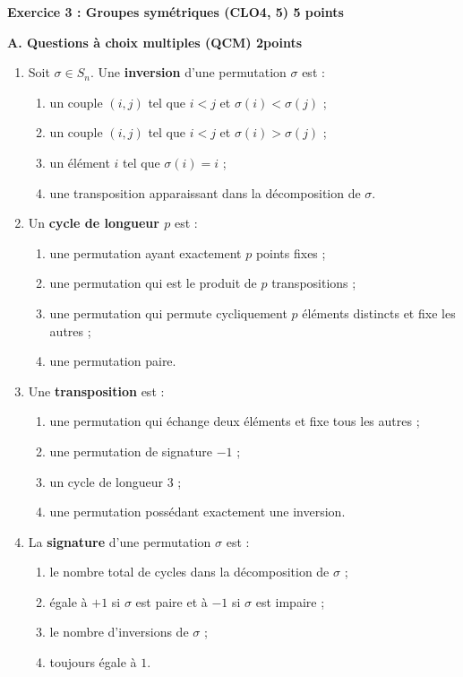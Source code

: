 \documentclass[10pt,openbib,a4paper,openright,a4paper]{article}%
\begin{document}
\textbf{{\large Exercice 3 : Groupes symétriques} (CLO4, 5) 5 points}

\medskip
\textbf{A. Questions à choix multiples (QCM) 2points}

\begin{enumerate}
\item Soit $\sigma \in S_n$. Une \textbf{inversion} d’une permutation $\sigma$ est :
\begin{enumerate}
\item un couple $(i,j)$ tel que $i<j$ et $\sigma(i)<\sigma(j)$ ;
\item un couple $(i,j)$ tel que $i<j$ et $\sigma(i)>\sigma(j)$ ;
\item un élément $i$ tel que $\sigma(i)=i$ ;
\item une transposition apparaissant dans la décomposition de $\sigma$.
\end{enumerate}

\item Un \textbf{cycle de longueur $p$} est :
\begin{enumerate}
\item une permutation ayant exactement $p$ points fixes ;
\item une permutation qui est le produit de $p$ transpositions ;
\item une permutation qui permute cycliquement $p$ éléments distincts et fixe les autres ;
\item une permutation paire.
\end{enumerate}

\item Une \textbf{transposition} est :
\begin{enumerate}
\item une permutation qui échange deux éléments et fixe tous les autres ;
\item une permutation de signature $-1$ ;
\item un cycle de longueur $3$ ;
\item une permutation possédant exactement une inversion.
\end{enumerate}

\item La \textbf{signature} d’une permutation $\sigma$ est :
\begin{enumerate}
\item le nombre total de cycles dans la décomposition de $\sigma$ ;
\item égale à $+1$ si $\sigma$ est paire et à $-1$ si $\sigma$ est impaire ;
\item le nombre d’inversions de $\sigma$ ;
\item toujours égale à $1$.
\end{enumerate}
\end{enumerate}
\end{document}
